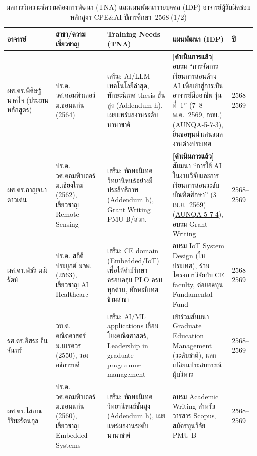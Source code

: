 \begin{table}[htbp]
  \centering
  \caption{ผลการวิเคราะห์ความต้องการพัฒนา (TNA) และแผนพัฒนารายบุคคล (IDP) อาจารย์ผู้รับผิดชอบหลักสูตร CPE\&AI ปีการศึกษา~2568 (1/2)}
  \label{tbl:staff_idp_2568}
  \begingroup
  \footnotesize
  \setlength{\tabcolsep}{3pt}
  \renewcommand{\arraystretch}{1.2}
  \begin{tabularx}{\linewidth}{|>{\raggedright\arraybackslash}p{3.0cm}|>{\raggedright\arraybackslash}p{2.6cm}|>{\raggedright\arraybackslash}X|>{\raggedright\arraybackslash}X|l|}
    \hline
    \textbf{อาจารย์} & \textbf{สาขา/ความเชี่ยวชาญ} & \textbf{Training Needs (TNA)} & \textbf{แผนพัฒนา (IDP)} & \textbf{ปี} \\
    \hline
    ผศ.ดร.พิศิษฐ์ นาคใจ (ประธานหลักสูตร) &
    ปร.ด. วศ.คอมพิวเตอร์ ม.ขอนแก่น (2564) &
    เสริม: AI/LLM เทคโนโลยีล่าสุด, ทักษะนิเทศ thesis ขั้นสูง (Addendum h), เผยแพร่ผลงานระดับนานาชาติ &
    \textbf{[ดำเนินการแล้ว]} อบรม ``การจัดการเรียนการสอนด้าน AI เพื่อเข้าสู่การเป็นอาจารย์มืออาชีพ รุ่นที่~1'' (7--8 พ.ค.~2569, กทม.) (\hyperlink{ref:AUNQA-5-7-3}{AUNQA-5-7-3}), ยื่นขอทุนนำเสนอผลงานต่างประเทศ &
    2568--2569 \\
    \hline
    ผศ.ดร.กาญจนา ดาวเด่น &
    ปร.ด. วศ.คอมพิวเตอร์ ม.เชียงใหม่ (2562), เชี่ยวชาญ Remote Sensing &
    เสริม: ทักษะนิเทศวิทยานิพนธ์อย่างมีประสิทธิภาพ (Addendum h), Grant Writing PMU-B/สวก. &
    \textbf{[ดำเนินการแล้ว]} สัมมนา ``การใช้ AI ในงานวิจัยและการเรียนการสอนระดับบัณฑิตศึกษา'' (3 เม.ย.~2569) (\hyperlink{ref:AUNQA-5-7-4}{AUNQA-5-7-4}), อบรม Grant Writing &
    2568--2569 \\
    \hline
    ผศ.ดร.พัชรี มณีรัตน์ &
    ปร.ด. สถิติประยุกต์ มจพ. (2563), เชี่ยวชาญ AI Healthcare &
    เสริม: CE domain (Embedded/IoT) เพื่อให้คำปรึกษาครอบคลุม PLO ครบทุกด้าน, ทักษะนิเทศข้ามสาขา &
    อบรม IoT System Design (ในประเทศ), ร่วมโครงการวิจัยกับ CE faculty, ต่อยอดทุน Fundamental Fund &
    2568--2569 \\
    \hline
    รศ.ดร.อิสระ อินจันทร์ &
    วท.ด. คณิตศาสตร์ ม.นเรศวร (2550), รองอธิการบดี &
    เสริม: AI/ML applications เชื่อมโยงคณิตศาสตร์, Leadership in graduate programme management &
    เข้าร่วมสัมมนา Graduate Education Management (ระดับชาติ), แลกเปลี่ยนประสบการณ์ผู้บริหาร &
    2568--2569 \\
    \hline
    ผศ.ดร.โสภณ วิริยะรัตนกุล &
    ปร.ด. วศ.คอมพิวเตอร์ ม.ขอนแก่น (2560), เชี่ยวชาญ Embedded Systems &
    เสริม: ทักษะนิเทศวิทยานิพนธ์ขั้นสูง (Addendum h), เผยแพร่ผลงานระดับนานาชาติ &
    อบรม Academic Writing สำหรับวารสาร Scopus, สมัครทุนวิจัย PMU-B &
    2568--2569 \\
    \hline
  \end{tabularx}
  \endgroup
\end{table}

